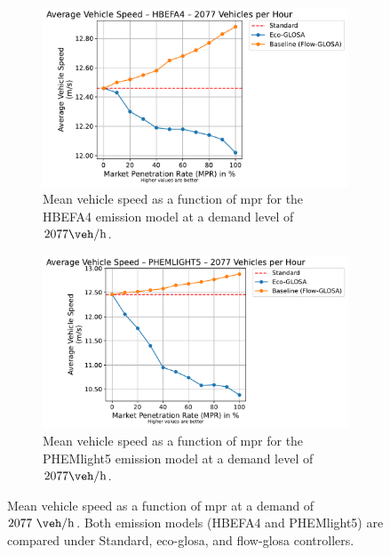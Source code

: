 \begin{figure}[htbp]
  \centering
  \begin{subfigure}[b]{0.98\textwidth}
    \includegraphics[width=\textwidth]{data/img/AverageVehicleSpeed/AverageVehicleSpeed_HBEFA4_Cars2077.pdf}
    \caption{Mean vehicle speed as a function of \ac{mpr} for the HBEFA4 emission model at a demand level of $2077\unit{\veh\per\hour}$.}
    \label{fig:MeanSpeed_HBEFA4_2077}
  \end{subfigure}
  \begin{subfigure}[b]{0.98\textwidth}
    \includegraphics[width=\textwidth]{data/img/AverageVehicleSpeed/AverageVehicleSpeed_PHEMLIGHT5_Cars2077.pdf}
    \caption{Mean vehicle speed as a function of \ac{mpr} for the PHEMlight5 emission model at a demand level of $2077\unit{\veh\per\hour}$.}
    \label{fig:MeanSpeed_PHEM_2077}
  \end{subfigure}
  \caption[Mean speed vs. \ac{mpr} at $2077\unit{\veh\per\hour}$]{%
    Mean vehicle speed as a function of \ac{mpr} at a demand of $2077~\unit{\veh\per\hour}$. Both emission models (HBEFA4 and PHEMlight5) are compared under Standard, \ac{eco-glosa}, and \ac{flow-glosa} controllers.
  }
  \label{fig:MeanSpeed_2077}
\end{figure}

